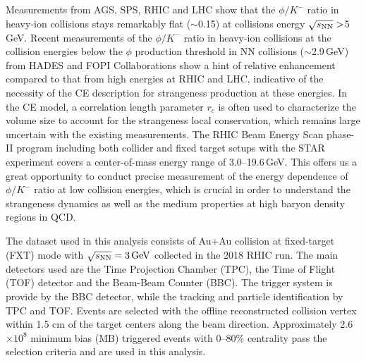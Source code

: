 \documentclass[%
 reprint,	
showpacs,
 amsmath,amssymb,
 aps,
 prc,
]{revtex4-1}
\begin{document}
Measurements from AGS, SPS, RHIC and LHC show that the $\phi/K^-$ ratio in heavy-ion collisions stays remarkably flat ($\sim$0.15) at collisions energy $\sqrt{s_{\rm NN}}>$5\,GeV. Recent measurements of the $\phi/K^-$ ratio in heavy-ion collisions at the collision energies below the $\phi$ production threshold in NN collisions ($\sim$2.9\,GeV) from HADES and FOPI Collaborations show a hint of relative enhancement compared to that from high energies at RHIC and LHC, %
indicative of the necessity of the CE description for strangeness production at these energies. In the CE model, a correlation length parameter $r_c$ is often used to characterize the volume size to account for the strangeness local conservation, which remains large uncertain with the existing measurements.
The RHIC Beam Energy Scan phase-II program including both collider and fixed target setups with the STAR experiment covers a center-of-mass energy range of 3.0--19.6\,GeV. This offers us a great opportunity to conduct precise measurement of the energy dependence of $\phi/K^-$ ratio at low collision energies, which is crucial in order to understand the strangeness dynamics as well as the medium properties at high baryon density regions in QCD.

The dataset used in this analysis consists of Au+Au collision at fixed-target (FXT) mode with ${\sqrt{s_{\rm NN}} = \rm{3\,GeV}}$ collected in the 2018 RHIC run. The main detectors used are the Time Projection Chamber (TPC), the Time of Flight (TOF) detector and the Beam-Beam Counter (BBC). The trigger system is provide by the BBC detector, while the tracking and particle identification by TPC and TOF. Events are selected with the offline reconstructed collision vertex within 1.5 cm of the target centers along the beam direction. Approximately 2.6$\times 10^{8}$ minimum bias (MB) triggered events with 0--80\% centrality pass the selection criteria and are used in this analysis. 
\end{document}

